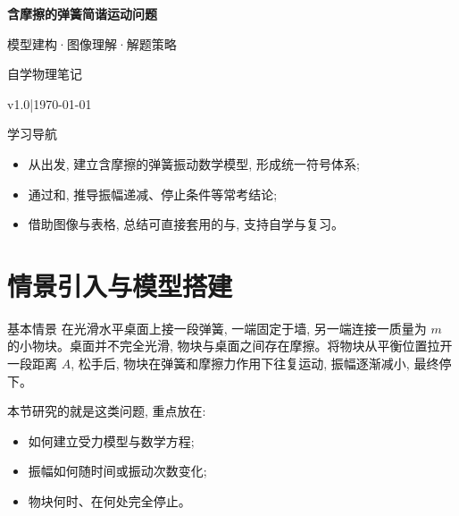 \documentclass[a4paper,11pt]{ctexart}
\renewcommand{\notetitle}{含摩擦的弹簧简谐运动问题}
\renewcommand{\notesubtitle}{模型建构·图像理解·解题策略}
\renewcommand{\noteauthor}{自学物理笔记}
\renewcommand{\notedate}{\today}
\renewcommand{\noteversion}{v1.0}
\begin{document}
\thispagestyle{empty}
\setcounter{page}{1}

\noindent
\begin{minipage}[t][0.7\textheight][c]{\textwidth}
  \raggedleft
  \vspace*{\fill}
  {\sffamily\bfseries\Huge\color{accent}\notetitle\par}
  \vspace{0.6em}
  {\Large\color{inkgray}\notesubtitle\par}
  \vspace{0.5em}
  {\large\color{inkgray}\noteauthor\par}
  \vspace{0.4em}
  {\normalsize\color{inkgray}\noteversion\quad|\quad\notedate\par}
  \vspace*{\fill}
\end{minipage}

\begin{center}
\begin{minipage}{0.84\textwidth}
  \textcolor{inkgray}{\sffamily\small 学习导航}\\
  \begin{itemize}
    \item 从出发, 建立含摩擦的弹簧振动数学模型, 形成统一符号体系;
    \item 通过和, 推导振幅递减、停止条件等常考结论;
    \item 借助图像与表格, 总结可直接套用的与, 支持自学与复习。 
  \end{itemize}
\end{minipage}
\end{center}
\vspace{1em}

\clearpage
\thispagestyle{plain}

\tableofcontents
\newpage


\section{情景引入与模型搭建}

\begin{definitionbox}{基本情景}
在光滑水平桌面上接一段弹簧, 一端固定于墙, 另一端连接一质量为 $m$ 的小物块。桌面并不完全光滑, 物块与桌面之间存在摩擦。将物块从平衡位置拉开一段距离 $A$, 松手后, 物块在弹簧和摩擦力作用下往复运动, 振幅逐渐减小, 最终停下。

本节研究的就是这类问题, 重点放在:
\begin{itemize}
  \item 如何建立受力模型与数学方程;
  \item 振幅如何随时间或振动次数变化;
  \item 物块何时、在何处完全停止。
\end{itemize}
\end{definitionbox}
\end{document}
